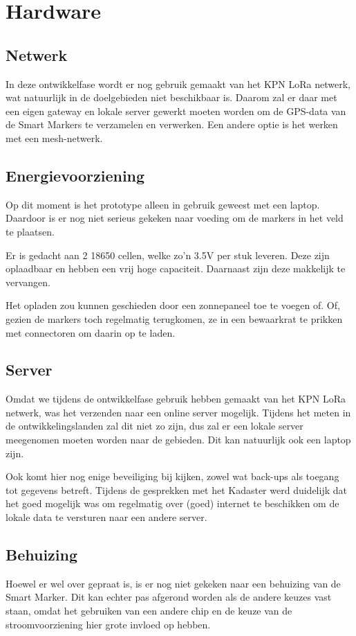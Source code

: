 \section{Hardware}

\subsection{Netwerk}
In deze ontwikkelfase wordt er nog gebruik gemaakt van het KPN LoRa netwerk, wat
natuurlijk in de doelgebieden niet beschikbaar is. Daarom zal er daar met een eigen
gateway en lokale server gewerkt moeten worden om de GPS-data van de Smart Markers
te verzamelen en verwerken. Een andere optie is het werken met een mesh-netwerk.

\subsection{Energievoorziening}
Op dit moment is het prototype alleen in gebruik geweest met een laptop. Daardoor
is er nog niet serieus gekeken naar voeding om de markers in het veld te plaatsen.

Er is gedacht aan 2 18650 cellen, welke zo'n 3.5V per stuk leveren. Deze zijn
oplaadbaar en hebben een vrij hoge capaciteit. Daarnaast zijn deze makkelijk te
vervangen.

Het opladen zou kunnen geschieden door een zonnepaneel toe te voegen of. Of, gezien
de markers toch regelmatig terugkomen, ze in een bewaarkrat te prikken met connectoren
om daarin op te laden.

\subsection{Server}
Omdat we tijdens de ontwikkelfase gebruik hebben gemaakt van het KPN LoRa netwerk, was
het verzenden naar een online server mogelijk.
Tijdens het meten in de ontwikkelingslanden zal dit niet zo zijn, dus zal er een lokale
server meegenomen moeten worden naar de gebieden. Dit kan natuurlijk ook een laptop zijn.

Ook komt hier nog enige beveiliging bij kijken, zowel wat back-ups als toegang tot
gegevens betreft. Tijdens de gesprekken met het Kadaster werd duidelijk dat het goed
mogelijk was om regelmatig over (goed) internet te beschikken om de lokale data te
versturen naar een andere server.

\subsection{Behuizing}
Hoewel er wel over gepraat is, is er nog niet gekeken naar een behuizing van de
Smart Marker. Dit kan echter pas afgerond worden als de andere keuzes vast staan,
omdat het gebruiken van een andere chip en de keuze van de stroomvoorziening hier
grote invloed op hebben.
